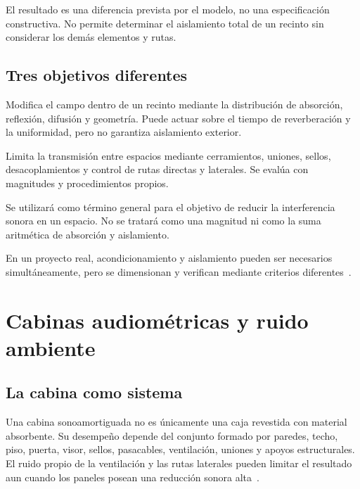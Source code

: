 El resultado es una diferencia prevista por el modelo, no una especificación
constructiva. No permite determinar el aislamiento total de un recinto sin
considerar los demás elementos y rutas.

\subsection{Tres objetivos diferentes}
\label{sec:u9-acondicionamiento-insonorizacion}

\begin{description}[style=nextline]
    \item[Acondicionamiento acústico.]
    Modifica el campo dentro de un recinto mediante la distribución de
    absorción, reflexión, difusión y geometría. Puede actuar sobre el tiempo de
    reverberación y la uniformidad, pero no garantiza aislamiento exterior.

    \item[Aislamiento acústico.]
    Limita la transmisión entre espacios mediante cerramientos, uniones,
    sellos, desacoplamientos y control de rutas directas y laterales. Se evalúa
    con magnitudes y procedimientos propios.

    \item[Insonorización.]
    Se utilizará como término general para el objetivo de reducir la
    interferencia sonora en un espacio. No se tratará como una magnitud ni como
    la suma aritmética de absorción y aislamiento.
\end{description}

En un proyecto real, acondicionamiento y aislamiento pueden ser
necesarios simultáneamente, pero se dimensionan y verifican mediante criterios
diferentes~\cite{moser2009}.

\section{Cabinas audiométricas y ruido ambiente}
\label{sec:u9-cabinas}

\subsection{La cabina como sistema}
\label{sec:u9-cabina-sistema}

Una cabina sonoamortiguada no es únicamente una caja revestida con material
absorbente. Su desempeño depende del conjunto formado por paredes,
techo, piso, puerta, visor, sellos, pasacables, ventilación, uniones y apoyos
estructurales. El ruido propio de la ventilación y las rutas laterales pueden
limitar el resultado aun cuando los paneles posean una reducción sonora alta~\cite{moser2009}.


